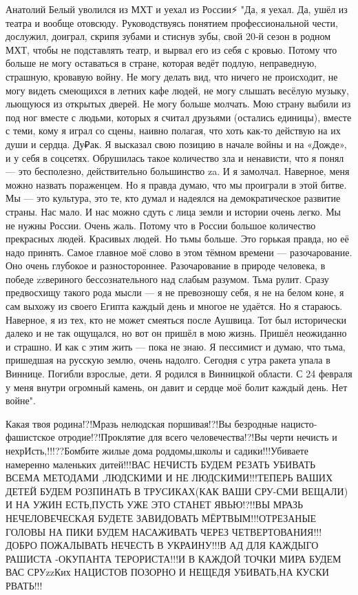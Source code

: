 Анатолий Белый уволился из МХТ и уехал из России⚡
"Да, я уехал. Да, ушёл из театра и вообще отовсюду. Руководствуясь понятием профессиональной чести, дослужил, доиграл, скрипя зубами и стиснув зубы, свой 20-й сезон в родном МХТ, чтобы не подставлять театр, и вырвал его из себя с кровью. Потому что больше не могу оставаться в стране, которая ведёт подлую, неправедную, страшную, кровавую войну. Не могу делать вид, что ничего не происходит, не могу видеть смеющихся в летних кафе людей, не могу слышать весёлую музыку, льющуюся из открытых дверей. Не могу больше молчать.
Мою страну выбили из под ног вместе с людьми, которых я считал друзьями (остались единицы), вместе с теми, кому я играл со сцены, наивно полагая, что хоть как-то действую на их души и сердца. Ду₽ак.
Я высказал свою позицию в начале войны и на «Дожде», и у себя в соцсетях. Обрушилась такое количество зла и ненависти, что я понял — это бесполезно, действительно большинство za. И я замолчал. Наверное, меня можно назвать пораженцем. Но я правда думаю, что мы проиграли в этой битве. Мы — это культура, это те, кто думал и надеялся на демократическое развитие страны. Нас мало. И нас можно сдуть с лица земли и истории очень легко. Мы не нужны России. Очень жаль. Потому что в России большое количество прекрасных людей. Красивых людей. Но тьмы больше.
Это горькая правда, но её надо принять. Самое главное моё слово в этом тёмном времени — разочарование. Оно очень глубокое и разностороннее. Разочарование в природе человека, в победе zzвериного бессознательного над слабым разумом. Тьма рулит. Сразу предвосхищу такого рода мысли — я не превозношу себя, я не на белом коне, я сам выхожу из своего Египта каждый день и многое не удаётся. Но я стараюсь.
Наверное, я из тех, кто не может смеяться после Аушвица. Тот был исторически далеко и не так ощущался, но вот он пришёл в мою жизнь. Пришёл неожиданно и страшно. И как с этим жить — пока не знаю. Я пессимист и думаю, что тьма, пришедшая на русскую землю, очень надолго.
Сегодня с утра ракета упала в Виннице. Погибли взрослые, дети. Я родился в Винницкой области. С 24 февраля у меня внутри огромный камень, он давит и сердце моё болит каждый день.
Нет войне".

Какая твоя родина!?!Мразь нелюдская поршивая!?!Вы безродные нацисто-фашистское
отродие!?!Проклятие для всего человечества!?!Вы черти нечисть и
нехрИсть,!!!??Бомбите жилые дома роддомы,школы и садики!!!Убиваете намеренно
маленьких дитей!!!ВАС НЕЧИСТЬ БУДЕМ РЕЗАТЬ УБИВАТЬ ВСЕМА МЕТОДАМИ ,ЛЮДСКИМИ И
НЕ ЛЮДСКИМИ!!!ТЕПЕРЬ ВАШИХ ДЕТЕЙ БУДЕМ РОЗПИНАТЬ В ТРУСИКАХ(КАК ВАШИ СРУ-СМИ
ВЕЩАЛИ) И НА УЖИН ЕСТЬ,ПУСТЬ УЖЕ ЭТО СТАНЕТ ЯВЬЮ!?!!ВЫ МРАЗЬ НЕЧЕЛОВЕЧЕСКАЯ
БУДЕТЕ ЗАВИДОВАТЬ МЁРТВЫМ!!!ОТРЕЗАНЫЕ ГОЛОВЫ НА ПИКИ БУДЕМ НАСАЖИВАТЬ ЧЕРЕЗ
ЧЕТВЕРТОВАНИЯ!!!ДОБРО ПОЖАЛЫВАТЬ НЕЧЕСТЬ В УКРАИНУ!!!В АД ДЛЯ КАЖДЫГО РАШИСТА
-ОКУПАНТА ТЕРОРИСТА!!!И В КАЖДОЙ ТОЧКИ МИРА БУДЕМ ВАС СРУzzКих НАЦИСТОВ ПОЗОРНО
И НЕЩЕДЯ УБИВАТЬ,НА КУСКИ РВАТЬ!!!

